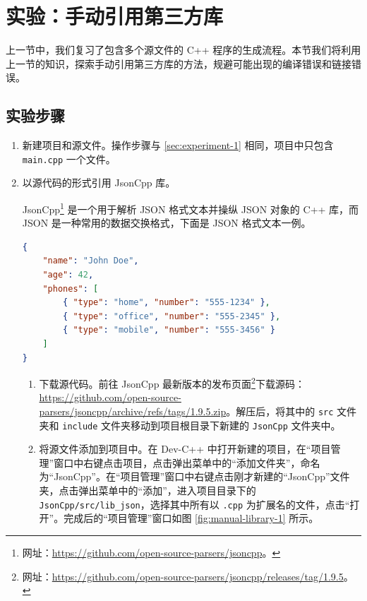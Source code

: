 
\section{实验：手动引用第三方库\label{sec:experiment-2}}

上一节中，我们复习了包含多个源文件的 C++ 程序的生成流程。本节我们将利用上一节的知识，探索手动引用第三方库的方法，规避可能出现的编译错误和链接错误。

\subsection*{实验步骤}

\begin{enumerate}
	\item 新建项目和源文件。操作步骤与 \ref{sec:experiment-1} 相同，项目中只包含 \lstinline[language={}]{main.cpp} 一个文件。

	\item 以源代码的形式引用 JsonCpp 库。\label{item:exp-2-2}

	JsonCpp\footnote{网址：\url{https://github.com/open-source-parsers/jsoncpp}。} 是一个用于解析 JSON 格式文本并操纵 JSON 对象的 C++ 库，而 JSON 是一种常用的数据交换格式，下面是 JSON 格式文本一例。

	\begin{lstlisting}[language={JSON}]
{
	"name": "John Doe",
	"age": 42,
	"phones": [
		{ "type": "home", "number": "555-1234" },
		{ "type": "office", "number": "555-2345" },
		{ "type": "mobile", "number": "555-3456" }
	]
}
	\end{lstlisting}

	\begin{enumerate}
		\item 下载源代码。前往 JsonCpp 最新版本的发布页面\footnote{网址：\url{https://github.com/open-source-parsers/jsoncpp/releases/tag/1.9.5}。}下载源码：\url{https://github.com/open-source-parsers/jsoncpp/archive/refs/tags/1.9.5.zip}。解压后，将其中的 \lstinline[language={}]{src} 文件夹和 \lstinline[language={}]{include} 文件夹移动到项目根目录下新建的 \lstinline[language={}]{JsonCpp} 文件夹中。

		\item 将源文件添加到项目中。\label{item:exp-2-2-2}在 Dev-C++ 中打开新建的项目，在“项目管理”窗口中右键点击项目，点击弹出菜单中的“添加文件夹”，命名为“JsonCpp”。在“项目管理”窗口中右键点击刚才新建的“JsonCpp”文件夹，点击弹出菜单中的“添加”，进入项目目录下的 \lstinline[language={}]{JsonCpp/src/lib_json}，选择其中所有以 \lstinline[language={}]{.cpp} 为扩展名的文件，点击“打开”。完成后的“项目管理”窗口如图 \ref{fig:manual-library-1} 所示。


\end{enumerate}
\end{enumerate}
